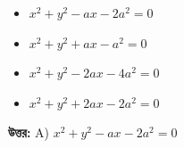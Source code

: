 \documentclass[12pt, a4paper]{article}
\begin{document}
\begin{itemize}[label={}, leftmargin=1cm, itemsep=0.5em]
    \item[\textbf{A)}] $x^2 + y^2 - ax - 2a^2 = 0$
    \item[\textbf{B)}] $x^2 + y^2 + ax - a^2 = 0$
    \item[\textbf{C)}] $x^2 + y^2 - 2ax - 4a^2 = 0$
    \item[\textbf{D)}] $x^2 + y^2 + 2ax - 2a^2 = 0$
\end{itemize}

\vspace{0.5em}
\begin{tcolorbox}[answerbox]
    \textbf{\color{success} উত্তর:} A) $x^2 + y^2 - ax - 2a^2 = 0$
\end{tcolorbox}
\vspace{1em}
\end{document}
